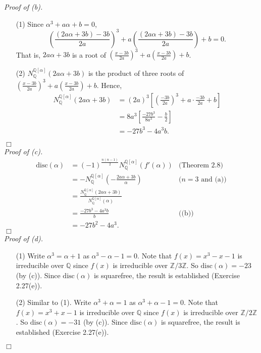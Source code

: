 \documentclass{article}
\begin{document}
\emph{Proof of (b).}
\begin{enumerate}
\item[(1)]
  Since $\alpha^3 + a\alpha + b = 0$,
  \[
    \left( \frac{(2a\alpha+3b)-3b}{2a} \right)^3
    + a\left( \frac{(2a\alpha+3b)-3b}{2a} \right) + b = 0.
  \]
  That is, $2a\alpha+3b$ is a root of
  $\left( \frac{x-3b}{2a} \right)^3 + a\left( \frac{x-3b}{2a} \right) + b$.

\item[(2)]
  $N_{\mathbb{Q}}^{\mathbb{Q}[\alpha]}(2a\alpha+3b)$ is the product of three roots of
  $\left( \frac{x-3b}{2a} \right)^3 + a\left( \frac{x-3b}{2a} \right) + b$.
  Hence,
  \begin{align*}
    N_{\mathbb{Q}}^{\mathbb{Q}[\alpha]}(2a\alpha+3b)
    &= (2a)^3\left[ \left(\frac{-3b}{2a}\right)^3 + a \cdot \frac{-3b}{2a} + b \right] \\
    &= 8a^3\left[ \frac{-27b^3}{8a^3} - \frac{b}{2} \right] \\
    &= -27b^3-4a^3b.
  \end{align*}
\end{enumerate}
$\Box$ \\



\emph{Proof of (c).}
\begin{align*}
  \textrm{disc}(\alpha)
  &= (-1)^{\frac{n(n-1)}{2}} N_{\mathbb{Q}}^{\mathbb{Q}[\alpha]}(f'(\alpha))
    &\text{(Theorem 2.8)} \\
  &= - N_{\mathbb{Q}}^{\mathbb{Q}[\alpha]}\left( -\frac{2a\alpha+3b}{\alpha} \right)
    &\text{($n=3$ and (a))} \\
  &= \frac{N_{\mathbb{Q}}^{\mathbb{Q}[\alpha]}(2a\alpha+3b)}
    {N_{\mathbb{Q}}^{\mathbb{Q}[\alpha]}(\alpha)} \\
  &= \frac{-27b^3-4a^3b}{b}
    &\text{((b))} \\
  &= -27b^2-4a^3.
\end{align*}
$\Box$ \\



\emph{Proof of (d).}
\begin{enumerate}
\item[(1)]
  Write $\alpha^3 = \alpha + 1$ as $\alpha^3 - \alpha - 1 = 0$.
  Note that $f(x) = x^3 - x - 1$ is irreducible over $\mathbb{Q}$
  since $f(x)$ is irreducible over $\mathbb{Z}/3\mathbb{Z}$.
  So $\textrm{disc}(\alpha) = -23$ (by (c)).
  Since $\textrm{disc}(\alpha)$ is squarefree,
  the result is established (Exercise 2.27(e)).

\item[(2)]
  Similar to (1).
  Write $\alpha^3 + \alpha = 1$ as $\alpha^3 + \alpha - 1 = 0$.
  Note that $f(x) = x^3 + x - 1$ is irreducible over $\mathbb{Q}$
  since $f(x)$ is irreducible over $\mathbb{Z}/2\mathbb{Z}$.
  So $\textrm{disc}(\alpha) = -31$ (by (c)).
  Since $\textrm{disc}(\alpha)$ is squarefree,
  the result is established (Exercise 2.27(e)).
\end{enumerate}
$\Box$ \\\\
\end{document}
